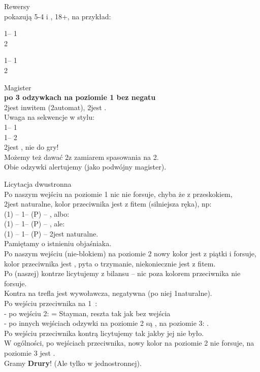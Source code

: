 \documentclass[12pt, a4paper]{article}
\begin{document}
\newpage

Rewersy\\
pokazują 5-4 i \gf, 18+, na przykład:

1\hearts -- 1\nt\\
2\spades

1\clubs -- 1\hearts\\
2\diams

\vspace{0.3cm}

Magister\\
\textbf{po 3 odzywkach na poziomie 1 bez negatu}\\ 2\clubs jest inwitem (2\diams automat),
2\diams jest \gf.\\
Uwaga na sekwencje w stylu:\\
1\diams -- 1\hearts\\
1\spades -- 2\diams\\
2\diams jest \gf, nie do gry!\\
Możemy też dawać 2\clubs z zamiarem spasowania na 2\diams.\\
Obie odzywki {\color{red}alertujemy} (jako podwójny magister).

\vspace{0.3cm}

Licytacja dwustronna\\
Po naszym wejściu na poziomie 1 nic nie forsuje, chyba że z przeskokiem,\\
2\clubs jest naturalne, kolor przeciwnika jest z fitem (silniejsza ręka), np:\\
(1\diams) -- 1\hearts -- (P) -- \alrts{2\diams}, albo:\\
(1\clubs) -- 1\hearts -- (P) -- \alrts{2\clubs}, ale:\\
(1\diams) -- 1\hearts -- (P) -- 2\clubs jest naturalne.\\
Pamiętamy o istnieniu objaśniaka.\\
Po naszym wejściu (nie-blokiem) na poziomie 2 nowy kolor jest z piątki i forsuje,
kolor przeciwnika jest \invp, pyta o trzymanie, niekoniecznie jest z fitem.\\
Po (naszej) kontrze licytujemy z bilansu -- nic poza kolorem przeciwnika nie forsuje.\\
Kontra na trefla jest wywoławcza, negatywna (po niej 1\diams naturalne).\\
Po wejściu przeciwnika na 1\ntx\ :\\
- po wejściu 2\clubs : \dbl = Stayman, reszta tak jak bez wejścia\\
- po innych wejściach odzywki na poziomie 2 są \nf, na poziomie 3: \gf.\\
Po wejściu przeciwnika kontrą licytujemy tak jakby jej nie było.\\
W ogólności, po wejściach przeciwnika, nowy kolor na poziomie 2 nie forsuje, na poziomie 3 jest \gf.\\
Gramy \textbf{Drury}! (Ale tylko w jednostronnej).
\end{document}
